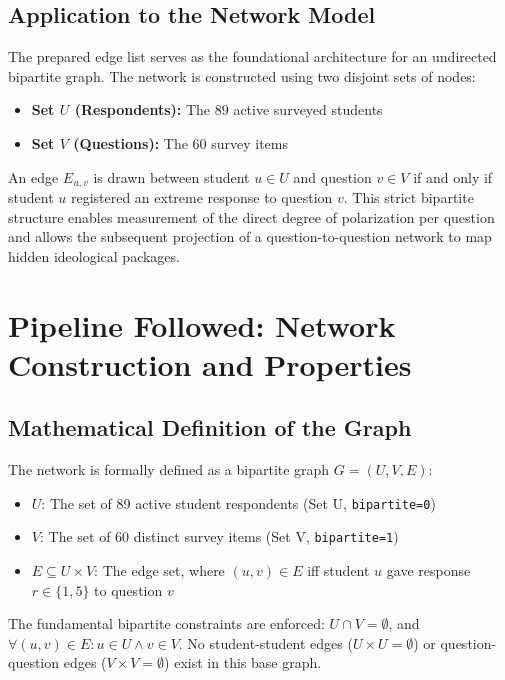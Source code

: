 \documentclass[11pt, a4paper]{article}
\begin{document}
\subsection{Application to the Network Model}

The prepared edge list serves as the foundational architecture for an undirected bipartite graph. The network is constructed using two disjoint sets of nodes:
\begin{itemize}
    \item \textbf{Set $U$ (Respondents):} The 89 active surveyed students
    \item \textbf{Set $V$ (Questions):} The 60 survey items
\end{itemize}
An edge $E_{u,v}$ is drawn between student $u \in U$ and question $v \in V$ if and only if student $u$ registered an extreme response to question $v$. This strict bipartite structure enables measurement of the direct degree of polarization per question and allows the subsequent projection of a question-to-question network to map hidden ideological packages.

\section{Pipeline Followed: Network Construction and Properties}

\subsection{Mathematical Definition of the Graph}

The network is formally defined as a bipartite graph $G = (U, V, E)$:
\begin{itemize}
    \item $U$: The set of 89 active student respondents (Set U, \texttt{bipartite=0})
    \item $V$: The set of 60 distinct survey items (Set V, \texttt{bipartite=1})
    \item $E \subseteq U \times V$: The edge set, where $(u, v) \in E$ iff student $u$ gave response $r \in \{1, 5\}$ to question $v$
\end{itemize}

The fundamental bipartite constraints are enforced: $U \cap V = \emptyset$, and $\forall (u, v) \in E: u \in U \land v \in V$. No student-student edges ($U \times U = \emptyset$) or question-question edges ($V \times V = \emptyset$) exist in this base graph.
\end{document}
